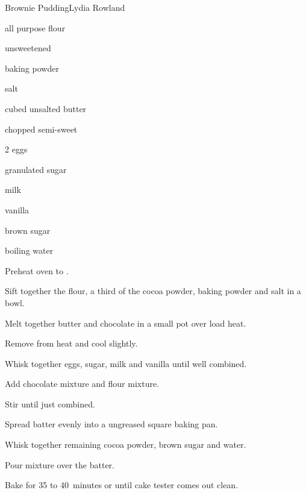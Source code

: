 \begin{recipe}{Brownie Pudding}{Lydia Rowland}{}

\begin{ingredients}
\item {} all purpose flour
\item \C{\twothird} unsweetened 
\item {} baking powder
\item \tp{\half} salt
\item {} cubed unsalted butter
\item \C{\half} chopped semi-sweet 
\item 2 eggs
\item {} granulated sugar
\item \C{\half} milk
\item {} vanilla
\item \C{\half} brown sugar
\item \C{1\third} boiling water
\end{ingredients}

\begin{directions}
\item Preheat oven to .
\item Sift together the flour, a third of the cocoa powder, baking powder and salt in a bowl.
\item Melt together butter and chocolate in a small pot over load heat.
\item Remove from heat and cool slightly.
\item Whisk together eggs, sugar, milk and vanilla until well combined.
\item Add chocolate mixture and flour mixture.
\item Stir until just combined.
\item Spread batter evenly into a ungreased  square baking pan.
\item Whisk together remaining cocoa powder, brown sugar and water.
\item Pour mixture over the batter.
\item Bake for 35 to 40~minutes or until cake tester comes out clean.
\end{directions}

\end{recipe}
